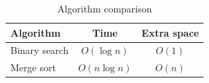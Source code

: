\documentclass{article}
\begin{document}
\begin{table}[ht]
\centering
\caption{Algorithm comparison}\label{tab:algorithms}
\begin{tabular}{lcc}
\toprule
Algorithm & Time & Extra space \\
\midrule
Binary search & $O(\log n)$ & $O(1)$ \\
Merge sort    & $O(n\log n)$ & $O(n)$ \\
\bottomrule
\end{tabular}
\end{table}
\end{document}
